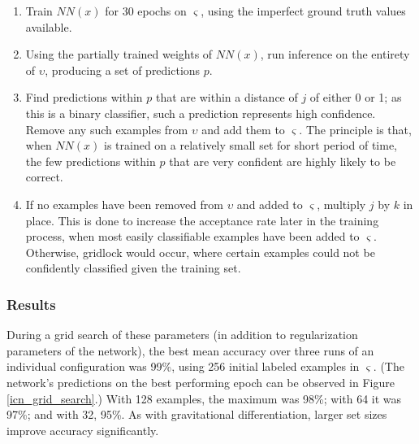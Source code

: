 \documentclass[10pt]{article}
\begin{document}
\begin{enumerate}
    \item Train $NN(x)$ for 30 epochs on $\varsigma$, using the imperfect ground truth values available.
    \item Using the partially trained weights of $NN(x)$, run inference on the entirety of $\upsilon$, producing a set of predictions $p$.
    \item Find predictions within $p$ that are within a distance of $j$ of either 0 or 1; as this is a binary classifier, such a prediction represents high confidence. Remove any such examples from $\upsilon$ and add them to $\varsigma$. The principle is that, when $NN(x)$ is trained on a relatively small set for short period of time, the few predictions within $p$ that are very confident are highly likely to be correct.
    \item If no examples have been removed from $\upsilon$ and added to $\varsigma$, multiply $j$ by $k$ in place. This is done to increase the acceptance rate later in the training process, when most easily classifiable examples have been added to $\varsigma$. Otherwise, gridlock would occur, where certain examples could not be confidently classified given the training set.
\end{enumerate}

\subsubsection{Results}

During a grid search of these parameters (in addition to regularization parameters of the network), the best mean accuracy over three runs of an individual configuration was 99\%, using 256 initial labeled examples in $\varsigma$. (The network's predictions on the best performing epoch can be observed in Figure \ref{icn_grid_search}.) With 128 examples, the maximum was 98\%; with 64 it was 97\%; and with 32, 95\%. As with gravitational differentiation, larger set sizes improve accuracy significantly.
\end{document}
